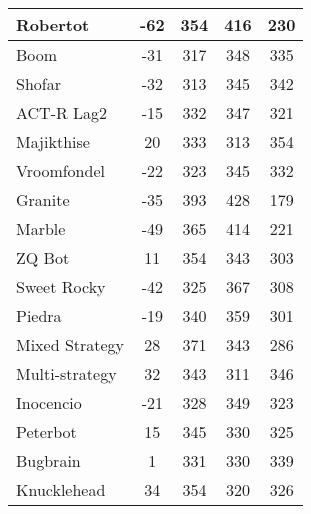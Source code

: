 \begin{table*}
\begin{tabular}{|l|c|c|c|c|}
Robertot & -62 & 354 & 416 & 230 \\ \hline 
Boom & -31 & 317 & 348 & 335 \\ \hline 
Shofar & -32 & 313 & 345 & 342 \\ \hline 
ACT-R Lag2 & -15 & 332 & 347 & 321 \\ \hline 
Majikthise & 20 & 333 & 313 & 354 \\ \hline 
Vroomfondel & -22 & 323 & 345 & 332 \\ \hline 
Granite & -35 & 393 & 428 & 179 \\ \hline 
Marble & -49 & 365 & 414 & 221 \\ \hline 
ZQ Bot & 11 & 354 & 343 & 303 \\ \hline 
Sweet Rocky & -42 & 325 & 367 & 308 \\ \hline 
Piedra & -19 & 340 & 359 & 301 \\ \hline 
Mixed Strategy & 28 & 371 & 343 & 286 \\ \hline 
Multi-strategy & 32 & 343 & 311 & 346 \\ \hline 
Inocencio & -21 & 328 & 349 & 323 \\ \hline 
Peterbot & 15 & 345 & 330 & 325 \\ \hline 
Bugbrain & 1 & 331 & 330 & 339 \\ \hline 
Knucklehead & 34 & 354 & 320 & 326 \\ \hline
        \end{tabular}
    \end{table*}
